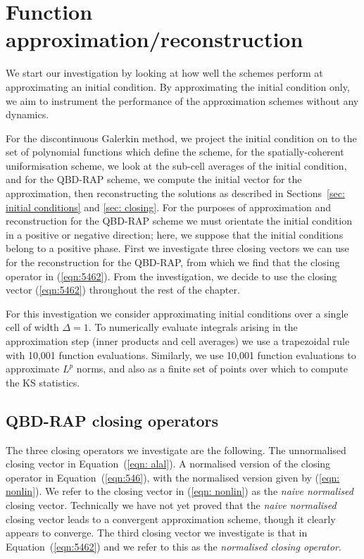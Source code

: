 

\section{Function approximation/reconstruction}\label{sec: recon num}
We start our investigation by looking at how well the schemes perform at approximating an initial condition. By approximating the initial condition only, we aim to instrument the performance of the approximation schemes without any dynamics.

For the discontinuous Galerkin method, we project the initial condition on to the set of polynomial functions which define the scheme, for the spatially-coherent uniformisation scheme, we look at the sub-cell averages of the initial condition, and for the QBD-RAP scheme, we compute the initial vector for the approximation, then reconstructing the solutions as described in Sections~\ref{sec: initial conditions} and \ref{sec: closing}. For the purposes of approximation and reconstruction for the QBD-RAP scheme we must orientate the initial condition in a positive or negative direction; here, we suppose that the initial conditions belong to a positive phase. First we investigate three closing vectors we can use for the reconstruction for the QBD-RAP, from which we find that the closing operator in (\ref{eqn:5462}). From the investigation, we decide to use the closing vector (\ref{eqn:5462}) throughout the rest of the chapter.

For this investigation we consider approximating initial conditions over a single cell of width \(\Delta = 1\). To numerically evaluate integrals arising in the approximation step (inner products and cell averages) we use a trapezoidal rule with 10,001 function evaluations. Similarly, we use 10,001 function evaluations to approximate \(L^p\) norms, and also as a finite set of points over which to compute the KS statistics. 


\subsection{QBD-RAP closing operators}\label{sec: closing vecs numerics}
The three closing operators we investigate are the following. The unnormalised closing vector in Equation~(\ref{eqn: alal}). A normalised version of the closing operator in Equation~(\ref{eqn:546}), with the normalised version given by (\ref{eqn: nonlin}). We refer to the closing vector in (\ref{eqn: nonlin}) as the \emph{naive normalised} closing vector. Technically we have not yet proved that the \emph{naive normalised} closing vector leads to a convergent approximation scheme, though it clearly appears to converge. The third closing vector we investigate is that in Equation~(\ref{eqn:5462}) and we refer to this as the \emph{normalised closing operator}. 

